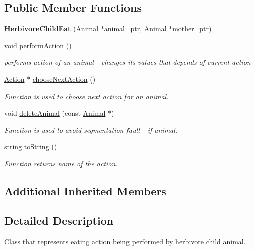 \subsection*{Public Member Functions}
\begin{DoxyCompactItemize}
\item 
\hypertarget{class_herbivore_child_eat_aa672db4e7c4e5a84e643f8393bd0d563}{}{\bfseries Herbivore\+Child\+Eat} (\hyperlink{class_animal}{Animal} $\ast$animal\+\_\+ptr, \hyperlink{class_animal}{Animal} $\ast$mother\+\_\+ptr)\label{class_herbivore_child_eat_aa672db4e7c4e5a84e643f8393bd0d563}

\item 
void \hyperlink{class_herbivore_child_eat_ab587b1aacdfbf5301d516d189352176f}{perform\+Action} ()
\begin{DoxyCompactList}\small\item\em performs action of an animal -\/ changes it\textquotesingle{}s values that depends of current action \end{DoxyCompactList}\item 
\hyperlink{class_action}{Action} $\ast$ \hyperlink{class_herbivore_child_eat_ae5349588055015e12ce6c384937b4354}{choose\+Next\+Action} ()
\begin{DoxyCompactList}\small\item\em Function is used to choose next action for an animal. \end{DoxyCompactList}\item 
void \hyperlink{class_herbivore_child_eat_adbe55d5ca2279f1b45d7816368f9a84d}{delete\+Animal} (const \hyperlink{class_animal}{Animal} $\ast$)
\begin{DoxyCompactList}\small\item\em Function is used to avoid segmentation fault -\/ if animal. \end{DoxyCompactList}\item 
string \hyperlink{class_herbivore_child_eat_a2ec22a4f5f382612e478e198fc8347ff}{to\+String} ()
\begin{DoxyCompactList}\small\item\em Function returns name of the action. \end{DoxyCompactList}\end{DoxyCompactItemize}
\subsection*{Additional Inherited Members}


\subsection{Detailed Description}
Class that represents eating action being performed by herbivore child animal. 

